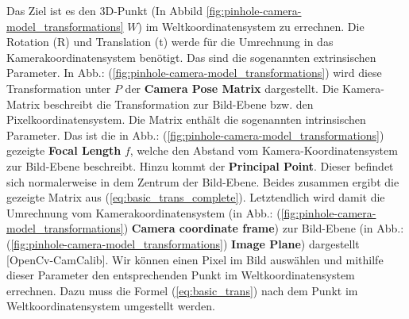 	Das Ziel ist es den 3D-Punkt (In Abbild \ref{fig:pinhole-camera-model_transformations} \( W \)) im Weltkoordinatensystem zu errechnen. Die Rotation (R) und Translation (t) werde für die Umrechnung in das Kamerakoordinatensystem benötigt. Das sind die sogenannten extrinsischen Parameter. In Abb.: (\ref{fig:pinhole-camera-model_transformations}) wird diese Transformation unter \( P \) der \textbf{Camera Pose Matrix} dargestellt. \newline
	Die Kamera-Matrix beschreibt die Transformation zur Bild-Ebene bzw. den Pixelkoordinatensystem. Die Matrix enthält die sogenannten intrinsischen Parameter. Das ist die in Abb.: (\ref{fig:pinhole-camera-model_transformations}) gezeigte \textbf{Focal Length} \( f \), welche den Abstand vom Kamera-Koordinatensystem zur Bild-Ebene beschreibt. Hinzu kommt der \textbf{Principal Point}. Dieser befindet sich normalerweise in dem Zentrum der Bild-Ebene. Beides zusammen ergibt die gezeigte Matrix aus (\ref{eq:basic_trans_complete}). Letztendlich wird damit die Umrechnung vom Kamerakoordinatensystem (in Abb.: (\ref{fig:pinhole-camera-model_transformations}) \textbf{Camera coordinate frame}) zur Bild-Ebene (in Abb.: (\ref{fig:pinhole-camera-model_transformations}) \textbf{Image Plane}) dargestellt [OpenCv-CamCalib]. \newline 
	Wir können einen Pixel im Bild auswählen und mithilfe dieser Parameter den entsprechenden Punkt im Weltkoordinatensystem errechnen. Dazu muss die Formel (\ref{eq:basic_trans}) nach dem Punkt im Weltkoordinatensystem umgestellt werden.
	
